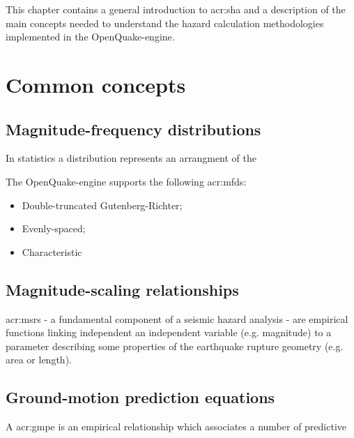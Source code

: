 This chapter contains a general introduction to \gls{acr:sha} and a 
description of the main concepts needed to understand the hazard calculation 
methodologies implemented in the OpenQuake-engine.

%
\section{Common concepts}
%
\subsection{Magnitude-frequency distributions}
%
In statistics a distribution represents an arrangment of the 

The OpenQuake-engine supports the following \glspl{acr:mfd}:
\begin{itemize}
    \item Double-truncated Gutenberg-Richter;
    \item Evenly-spaced;
    \item Characteristic \cite{youngs1985}
\end{itemize}
%
\subsection{Magnitude-scaling relationships}
%
\glspl{acr:msr} - a fundamental component of a seismic hazard analysis - are 
empirical functions linking independent an independent variable (e.g. 
magnitude) to a parameter describing some properties of the earthquake 
rupture geometry (e.g. area or length).
%
\subsection{Ground-motion prediction equations}
A \gls{acr:gmpe} is an empirical relationship which associates a number of 
predictive 
%
